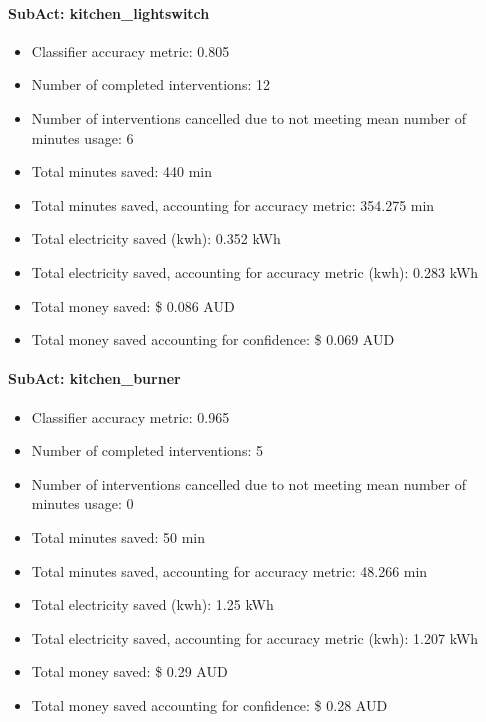\documentclass[11pt,]{article}
\providecommand{\tightlist}{%
  \setlength{\itemsep}{0pt}\setlength{\parskip}{0pt}}
\let\oldparagraph\paragraph
\renewcommand{\paragraph}[1]{\oldparagraph{#1}\mbox{}}
\begin{document}
\hypertarget{subact-kitchen_lightswitch}{%
\paragraph{SubAct:
kitchen\_lightswitch}\label{subact-kitchen_lightswitch}}

\begin{itemize}
\tightlist
\item
  Classifier accuracy metric: 0.805
\item
  Number of completed interventions: 12
\item
  Number of interventions cancelled due to not meeting mean number of
  minutes usage: 6
\item
  Total minutes saved: 440 min
\item
  Total minutes saved, accounting for accuracy metric: 354.275 min
\item
  Total electricity saved (kwh): 0.352 kWh
\item
  Total electricity saved, accounting for accuracy metric (kwh): 0.283
  kWh
\item
  Total money saved: \$ 0.086 AUD
\item
  Total money saved accounting for confidence: \$ 0.069 AUD
\end{itemize}

\hypertarget{subact-kitchen_burner}{%
\paragraph{SubAct: kitchen\_burner}\label{subact-kitchen_burner}}

\begin{itemize}
\tightlist
\item
  Classifier accuracy metric: 0.965
\item
  Number of completed interventions: 5
\item
  Number of interventions cancelled due to not meeting mean number of
  minutes usage: 0
\item
  Total minutes saved: 50 min
\item
  Total minutes saved, accounting for accuracy metric: 48.266 min
\item
  Total electricity saved (kwh): 1.25 kWh
\item
  Total electricity saved, accounting for accuracy metric (kwh): 1.207
  kWh
\item
  Total money saved: \$ 0.29 AUD
\item
  Total money saved accounting for confidence: \$ 0.28 AUD
\end{itemize}
\end{document}
